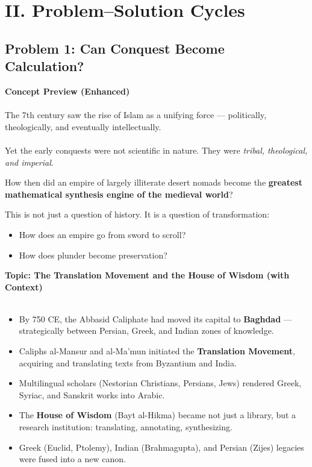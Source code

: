 \documentclass[9pt]{article}
\begin{document}
\newpage

\section*{II. Problem--Solution Cycles}

\subsection*{Problem 1: Can Conquest Become Calculation?}

\textbf{Concept Preview (Enhanced)} \\\\
The 7th century saw the rise of Islam as a unifying force --- politically, theologically, and eventually intellectually. \\\\
Yet the early conquests were not scientific in nature. They were \textit{tribal, theological, and imperial}.

How then did an empire of largely illiterate desert nomads become the \textbf{greatest mathematical synthesis engine of the medieval world}?

This is not just a question of history. It is a question of transformation:
\begin{itemize}
    \item How does an empire go from sword to scroll?
    \item How does plunder become preservation?
\end{itemize}

\vspace{1em}

\textbf{Topic: The Translation Movement and the House of Wisdom (with Context)} \\\\
\begin{itemize}
    \item By 750 CE, the Abbasid Caliphate had moved its capital to \textbf{Baghdad} --- strategically between Persian, Greek, and Indian zones of knowledge.
    \item Caliphs al-Mansur and al-Ma'mun initiated the \textbf{Translation Movement}, acquiring and translating texts from Byzantium and India.
    \item Multilingual scholars (Nestorian Christians, Persians, Jews) rendered Greek, Syriac, and Sanskrit works into Arabic.
    \item The \textbf{House of Wisdom} (Bayt al-Hikma) became not just a library, but a research institution: translating, annotating, synthesizing.
    \item Greek (Euclid, Ptolemy), Indian (Brahmagupta), and Persian (Zijes) legacies were fused into a new canon.
\end{itemize}
\end{document}
